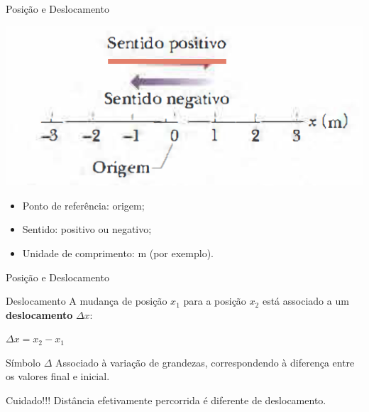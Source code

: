 \documentclass[xcolor=dvipsnames,table]{beamer}
\begin{document}
	\begin{frame}{Posição e Deslocamento}
		\begin{center}
			\includegraphics[scale=0.6]{images/fig2-1}
		\end{center}
		\begin{itemize}
			\item Ponto de referência: origem;
			\item Sentido: positivo ou negativo; 
			\item Unidade de comprimento: m (por exemplo).
		\end{itemize}
	\end{frame}

	\begin{frame}{Posição e Deslocamento}
		\begin{block}{Deslocamento}
			A mudança de posição $x_1$ para a posição $x_2$ está associado a um {\bf deslocamento} $\Delta x$: 
			\begin{center}
				$\Delta x = x_2 - x_1$
			\end{center}
		\end{block} 
		\begin{block}{Símbolo $\Delta$}
			Associado à variação de grandezas, correspondendo à diferença entre os valores final e inicial.
		\end{block} 
		\begin{alertblock}{Cuidado!!!}
			Distância efetivamente percorrida é diferente de deslocamento.
		\end{alertblock}
	\end{frame}
\end{document}
